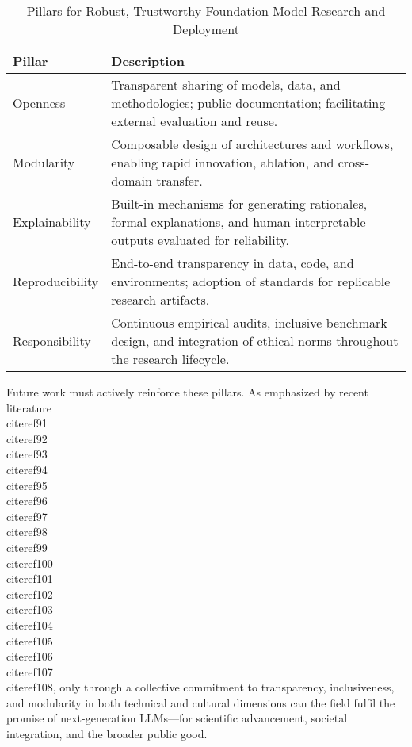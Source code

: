 \documentclass[11pt]{article}
\begin{document}
\begin{table}[h!]
    \centering
    \caption{Pillars for Robust, Trustworthy Foundation Model Research and Deployment}
    \label{tab:pillars_future}
    \begin{tabular}{|p{3cm}|p{10cm}|}
    \hline
    \textbf{Pillar} & \textbf{Description} \\
    \hline
    Openness        & Transparent sharing of models, data, and methodologies; public documentation; facilitating external evaluation and reuse. \\
    \hline
    Modularity      & Composable design of architectures and workflows, enabling rapid innovation, ablation, and cross-domain transfer. \\
    \hline
    Explainability  & Built-in mechanisms for generating rationales, formal explanations, and human-interpretable outputs evaluated for reliability. \\
    \hline
    Reproducibility & End-to-end transparency in data, code, and environments; adoption of standards for replicable research artifacts. \\
    \hline
    Responsibility  & Continuous empirical audits, inclusive benchmark design, and integration of ethical norms throughout the research lifecycle. \\
    \hline
    \end{tabular}
\end{table}

Future work must actively reinforce these pillars. As emphasized by recent literature~\\cite{ref91}\\cite{ref92}\\cite{ref93}\\cite{ref94}\\cite{ref95}\\cite{ref96}\\cite{ref97}\\cite{ref98}\\cite{ref99}\\cite{ref100}\\cite{ref101}\\cite{ref102}\\cite{ref103}\\cite{ref104}\\cite{ref105}\\cite{ref106}\\cite{ref107}\\cite{ref108}, only through a collective commitment to transparency, inclusiveness, and modularity in both technical and cultural dimensions can the field fulfil the promise of next-generation LLMs—for scientific advancement, societal integration, and the broader public good.



\end{document}
